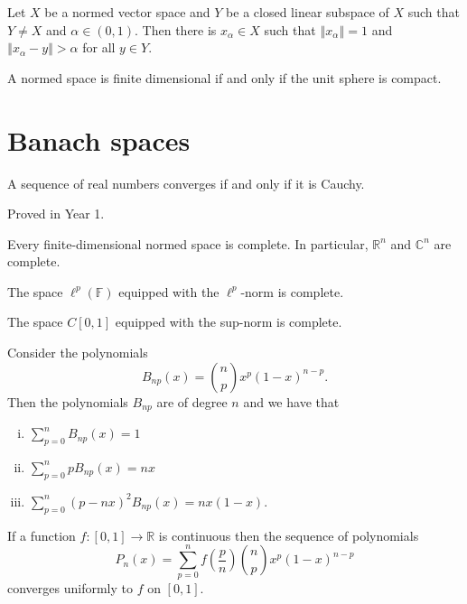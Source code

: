 \documentclass[a4paper]{article}
\newcommand{\F}{\mathbb{F}}
\newcommand{\R}{\mathbb{R}}
\renewcommand{\C}{\mathbb{C}}
\newcommand{\norm}[1]{\left\Vert #1 \right\Vert}
\newcommand{\<}{\langle}
\renewcommand{\>}{\rangle}
\renewcommand{\a}{\alpha}
\begin{document}
\begin{lemma}
  Let $X$ be a normed vector space and $Y$ be a closed linear subspace of $X$ such that $Y\neq X$ and $\a\in(0,1)$. Then there is $x_\a\in X$ such that $\norm{x_\a}=1$ and $\norm{x_\a-y}>\a$ for all $y\in Y$.
\end{lemma}

\begin{thm}
  A normed space is finite dimensional if and only if the unit sphere is compact.
\end{thm}

\section{Banach spaces}

\begin{thm}
  A sequence of real numbers converges if and only if it is Cauchy.
\end{thm}
Proved in Year 1.

\begin{thm}
  Every finite-dimensional normed space is complete. In particular, $\R^n$ and $\C^n$ are complete.
\end{thm}

\begin{thm}
  The space $\ell^p(\F)$ equipped with the $\ell^p$-norm is complete.
\end{thm}

\begin{thm}
  The space $C[0,1]$ equipped with the sup-norm is complete.
\end{thm}

\begin{thm}
  Consider the polynomials
  $$B_{np}(x) = \binom{n}{p}x^p(1-x)^{n-p}.$$
  Then the polynomials $B_{np}$ are of degree $n$ and we have that
  \begin{enumerate}[(i)]
    \item $\sum_{p=0}^n B_{np}(x) = 1$\\
    \item $\sum_{p=0}^n pB_{np}(x) = nx$\\
    \item $\sum_{p=0}^n (p-nx)^2B_{np}(x) = nx(1-x)$.
  \end{enumerate}
\end{thm}

\begin{thm}
  If a function $f:[0,1]\to\R$ is continuous then the sequence of polynomials
$$P_n(x) = \sum_{p=0}^n f\left(\frac{p}{n}\right)\binom{n}{p}x^p(1-x)^{n-p}$$
  converges uniformly to $f$ on $[0,1]$.
\end{thm}
\end{document}
